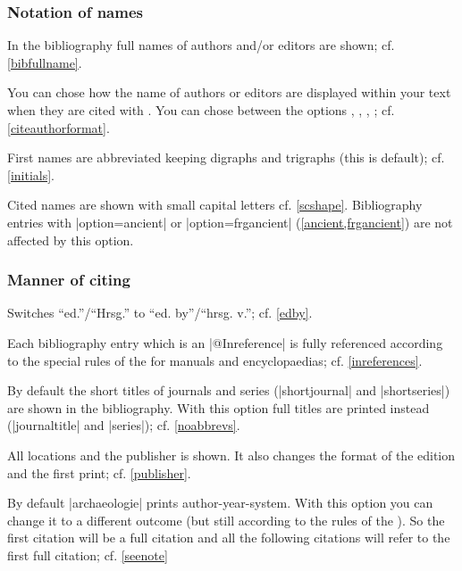 \documentclass[a4paper,
10pt,
greek,
french,
spanish,
italian,
ngerman,
english
]{ltxdoc}
\begin{document}
\subsubsection{Notation of names}
In the bibliography full names of authors and/or editors are shown; cf. \cref{bibfullname}.

You can chose how the name of authors or editors are displayed within your text when they are cited with .
You can chose between the options , , , ; 
cf. \cref{citeauthorformat}.



First names are abbreviated keeping digraphs and trigraphs (this is default); cf. \cref{initials}.

Cited names are shown with small capital letters cf. \cref{scshape}.
Bibliography entries with |option={ancient}| or |option={frgancient}| (\cref{ancient,frgancient}) are not affected by this option.

\subsubsection{Manner of citing}

Switches \enquote{ed.}/\enquote{Hrsg.} to \enquote{ed. by}/\enquote{hrsg. v.}; cf. \cref{edby}.

Each bibliography entry which is an |@Inreference| is fully referenced according to the special rules of the 
\DAI for manuals and encyclopaedias; cf. \cref{inreferences}.

By default the short titles of journals and series (|shortjournal| and |shortseries|) are shown in the bibliography.
With this option full titles are printed instead (|journaltitle| and |series|); cf. \cref{noabbrevs}.

All locations and the publisher is shown. 
It also changes the format of the edition and the first print; cf. \cref{publisher}.

By default |archaeologie| prints author-year-system. 
With this option you can change it to a different outcome (but still according to the rules of the \DAI). 
So the first citation will be a full citation and all the following citations will refer to the first full citation; cf. \cref{seenote}
\end{document}
